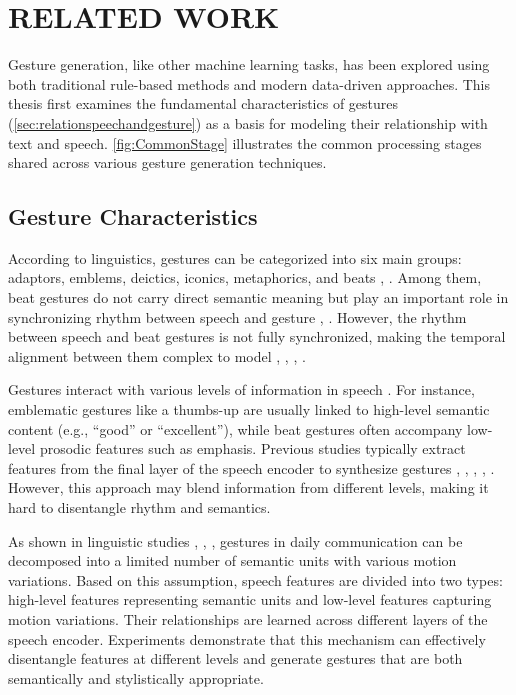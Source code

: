 \section{RELATED WORK}
\label{sec:related_work}


Gesture generation, like other machine learning tasks, has been explored using both traditional rule-based methods and modern data-driven approaches. This thesis first examines the fundamental characteristics of gestures (\autoref{sec:relationspeechandgesture}) as a basis for modeling their relationship with text and speech. \autoref{fig:CommonStage} illustrates the common processing stages shared across various gesture generation techniques.


\subsection{Gesture Characteristics}
\label{sec:relationspeechandgesture}

According to linguistics, gestures can be categorized into six main groups: adaptors, emblems, deictics, iconics, metaphorics, and beats \cite{ekman1969repertoire}, \cite{sebeok2011advances}. Among them, beat gestures do not carry direct semantic meaning but play an important role in synchronizing rhythm between speech and gesture \cite{kipp2005gesture}, \cite{sebeok2011advances}. However, the rhythm between speech and beat gestures is not fully synchronized, making the temporal alignment between them complex to model \cite{mcclave1994gestural}, \cite{bhattacharya2021speech2affectivegestures}, \cite{kucherenko2020gesticulator}, \cite{yoon2020speech}.

Gestures interact with various levels of information in speech \cite{sebeok2011advances}. For instance, emblematic gestures like a thumbs-up are usually linked to high-level semantic content (e.g., “good” or “excellent”), while beat gestures often accompany low-level prosodic features such as emphasis. Previous studies typically extract features from the final layer of the speech encoder to synthesize gestures \cite{alexanderson2020style}, \cite{bhattacharya2021speech2affectivegestures}, \cite{kucherenko2021large}, \cite{qian2021speech}, \cite{yoon2022genea}. However, this approach may blend information from different levels, making it hard to disentangle rhythm and semantics.

As shown in linguistic studies \cite{kipp2005gesture}, \cite{neff2008gesture}, \cite{webb1997linguistic}, gestures in daily communication can be decomposed into a limited number of semantic units with various motion variations. Based on this assumption, speech features are divided into two types: high-level features representing semantic units and low-level features capturing motion variations. Their relationships are learned across different layers of the speech encoder. Experiments demonstrate that this mechanism can effectively disentangle features at different levels and generate gestures that are both semantically and stylistically appropriate.





